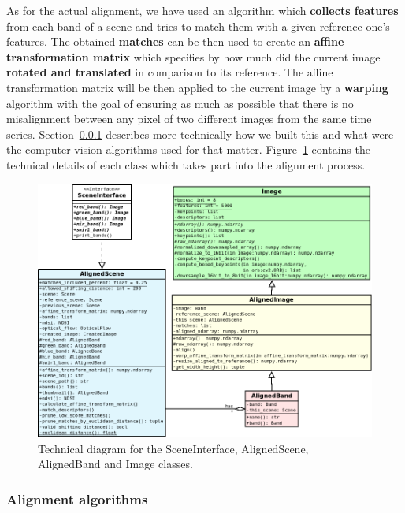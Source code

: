 \documentclass[12pt, a4paper]{report}
\begin{document}
	\par As for the actual alignment, we have used an algorithm which \textbf{collects features} from each band of a scene and tries to match them with a given reference one's features. The obtained \textbf{matches} can be then used to create an \textbf{affine transformation matrix} which specifies by how much did the current image \textbf{rotated and translated} in comparison to its reference. The affine transformation matrix will be then applied to the current image by a \textbf{warping} algorithm with the goal of ensuring as much as possible that there is no misalignment between any pixel of two different images from the same time series. Section~\ref{seq:alignment_algorithm} describes more technically how we built this and what were the computer vision algorithms used for that matter. Figure~\ref{fig:alignment_diagram} contains the technical details of each class which takes part into the alignment process.
	
	\begin{figure}[h!]
		\centering
		\includegraphics[scale=0.45]{../images/alignment_diagram.png}
		\caption{Technical diagram for the SceneInterface, AlignedScene, AlignedBand and Image classes.}
		\label{fig:alignment_diagram}
	\end{figure}

	\subsubsection{Alignment algorithms}
	\label{seq:alignment_algorithm}
	
\end{document}

